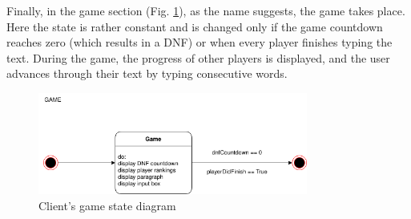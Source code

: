 \documentclass[titlepage]{article}
\newcommand{\figref}[1]{{(Fig. \hypersetup{linkcolor=blue}\ref{#1})}}
\begin{document}
Finally, in the game section \figref{fig:state-client-game}, as the name suggests, the game takes place. Here the state is rather constant and is changed only if the game countdown reaches zero (which results in a DNF) or when every player finishes typing the text. During the game, the progress of other players is displayed, and the user advances through their text by typing consecutive words.

\begin{figure}[H]
	\centering
	\includegraphics[width=0.79\textwidth]{state_diagram_game.png}
	\caption{Client's game state diagram}
	\label{fig:state-client-game}
\end{figure}
\end{document}
